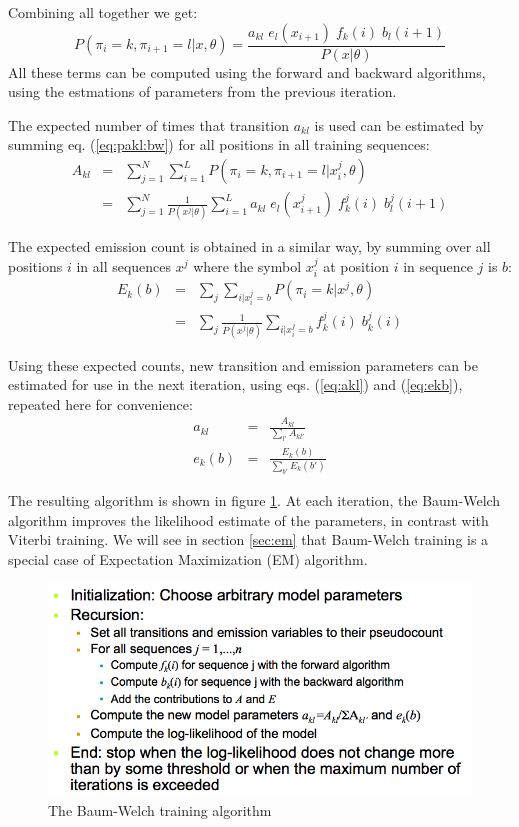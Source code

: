 Combining all together we get:
\begin{equation}
P(\pi_i = k, \pi_{i+1} = l | x, \theta) = 
\frac{a_{kl} \; e_l(x_{i+1}) \; f_k(i) \; b_l(i+1)}{P(x|\theta)}
\label{eq:pakl:bw}
\end{equation}
%
All these terms can be computed using the forward and backward algorithms, using the estmations of parameters from the previous iteration.

The expected number of times that transition $a_{kl}$ is used can be estimated by summing eq. (\ref{eq:pakl:bw}) for all positions in all training sequences:
\begin{eqnarray}
A_{kl} & = &
\sum_{j=1}^N \sum_{i=1}^L
P(\pi_i = k, \pi_{i+1} = l | x_i^j, \theta)
\\
& = &
\sum_{j=1}^N \frac{1}{P(x^j|\theta)}
\sum_{i=1}^L
a_{kl} \; e_l(x_{i+1}^j) \; f_k^j(i) \; b_l^j(i+1)
\end{eqnarray}

The expected emission count is obtained in a similar way, by summing over all positions $i$ in all sequences $x^j$ where the symbol $x_i^j$ at position $i$ in sequence $j$ is $b$:
\begin{eqnarray}
E_k(b) & = & \sum_j \sum_{i | x_i^j = b} P(\pi_i=k | x^j, \theta)
\\
& = & \sum_j \frac{1}{P(x^j|\theta)}
\sum_{i | x_i^j = b}
f_k^j(i) \; b_k^j(i)
\end{eqnarray}

Using these expected counts, new transition and emission parameters can be estimated for use in the next iteration, using eqs. (\ref{eq:akl}) and (\ref{eq:ekb}), repeated here for convenience:
\begin{eqnarray}
a_{kl} & = & \frac{A_{kl}}{\sum_{l'} A_{kl'}}
\label{eq:akl-bis}
\\
e_k(b) & = & \frac{E_k(b)}{\sum_{b'} E_k(b')}
\label{eq:ekb-bis}
\end{eqnarray}

The resulting algorithm is shown in figure \ref{fig:baumwelch}. At each iteration, the Baum-Welch algorithm improves the likelihood estimate of the parameters, in contrast with Viterbi training.
We will see in section \ref{sec:em} that Baum-Welch training is a special case of Expectation Maximization (EM) algorithm.

\begin{figure}[!htb]
\centerline{\includegraphics[width=.6\linewidth]{figs/BaumWelch.png}}
\caption{The Baum-Welch training algorithm}\label{fig:baumwelch}
\end{figure}

